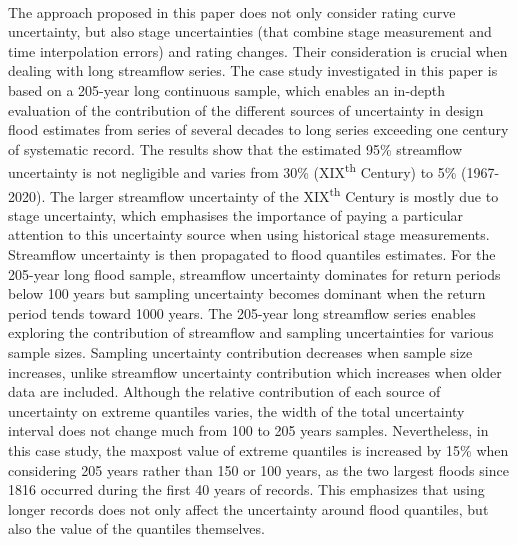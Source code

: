 \documentclass[11pt]{article}
\begin{document}
    \paragraph{}
    The approach proposed in this paper does not only consider rating curve uncertainty, but also stage uncertainties (that combine stage measurement and time interpolation errors) and rating changes. Their consideration is crucial when dealing with long streamflow series. The case study investigated in this paper is based on a 205-year long continuous sample, which enables an in-depth evaluation of the contribution of the different sources of uncertainty in design flood estimates from series of several decades to long series exceeding one century of systematic record. The results show that the estimated 95\% streamflow uncertainty is not negligible and varies from 30\% (XIX\textsuperscript{th} Century) to 5\% (1967-2020). The larger streamflow uncertainty of the XIX\textsuperscript{th} Century is mostly due to stage uncertainty, which emphasises the importance of paying a particular attention to this uncertainty source when using historical stage measurements. Streamflow uncertainty is then propagated to flood quantiles estimates. For the 205-year long flood sample, streamflow uncertainty dominates for return periods below 100 years but sampling uncertainty becomes dominant when the return period tends toward 1000 years. The 205-year long streamflow series enables exploring the contribution of streamflow and sampling uncertainties for various sample sizes. Sampling uncertainty contribution decreases when sample size increases, unlike streamflow uncertainty contribution which increases when older data are included. Although the relative contribution of each source of uncertainty on extreme quantiles varies, the width of the total uncertainty interval does not change much from 100 to 205 years samples. Nevertheless, in this case study, the maxpost value of extreme quantiles is increased by 15\% when considering 205 years rather than 150 or 100 years, as the two largest floods since 1816 occurred during the first 40 years of records. This emphasizes that using longer records does not only affect the uncertainty around flood quantiles, but also the value of the quantiles themselves. 
\end{document}
